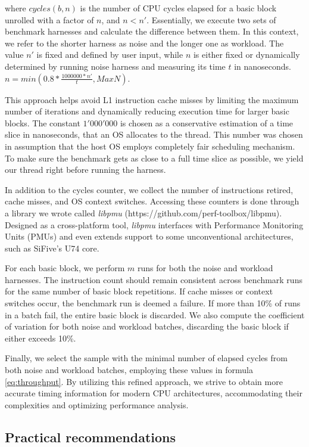where $cycles(b, n)$ is the number of CPU cycles elapsed for a basic block unrolled with a factor of $n$, and $n < n'$. Essentially, we execute two sets of benchmark harnesses and calculate the difference between them. In this context, we refer to the shorter harness as noise and the longer one as workload. The value $n'$ is fixed and defined by user input, while $n$ is either fixed or dynamically determined by running noise harness and measuring its time $t$ in nanoseconds.
$n = min(0.8*\frac{1000000 * n'}{t}, MaxN)$.

This approach helps avoid L1 instruction cache misses by limiting the maximum number of iterations and dynamically reducing execution time for larger basic blocks. The constant $1'000'000$ is chosen as a conservative estimation of a time slice in nanoseconds, that an OS allocates to the thread. This number was chosen in assumption that the host OS employs completely fair scheduling mechanism. To make sure the benchmark gets as close to a full time slice as possible, we yield our thread right before running the harness.

In addition to the cycles counter, we collect the number of instructions retired, cache misses, and OS context switches. Accessing these counters is done through a library we wrote called \textit{libpmu} (https://github.com/perf-toolbox/libpmu). Designed as a cross-platform tool, \textit{libpmu} interfaces with Performance Monitoring Units (PMUs) and even extends support to some unconventional architectures, such as SiFive's U74 core.

For each basic block, we perform $m$ runs for both the noise and workload harnesses. The instruction count should remain consistent across benchmark runs for the same number of basic block repetitions. If cache misses or context switches occur, the benchmark run is deemed a failure. If more than 10\% of runs in a batch fail, the entire basic block is discarded. We also compute the coefficient of variation for both noise and workload batches, discarding the basic block if either exceeds 10\%.

Finally, we select the sample with the minimal number of elapsed cycles from both noise and workload batches, employing these values in formula \ref{eq:throughput}. By utilizing this refined approach, we strive to obtain more accurate timing information for modern CPU architectures, accommodating their complexities and optimizing performance analysis.

\subsection{Practical recommendations}


